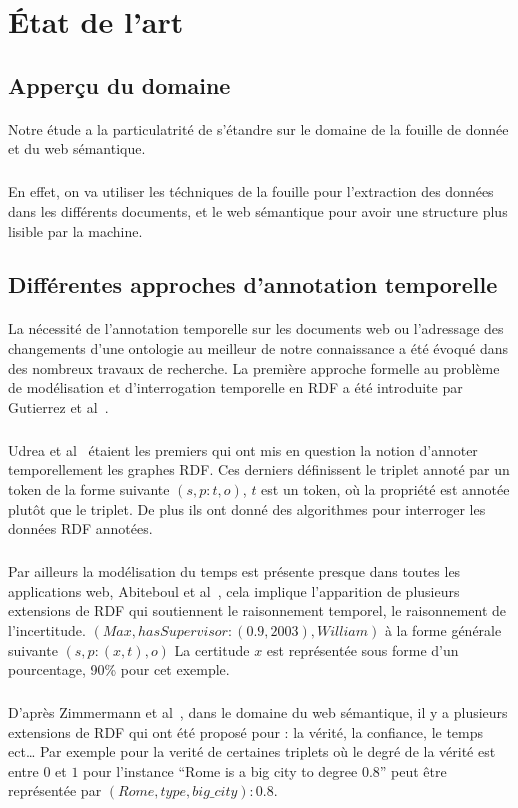 \section*{État de l'art}
\subsection*{Apperçu du domaine}
\paragraph{}
Notre étude a la particulatrité de s'étandre sur le domaine de la fouille de donnée et du web sémantique.
\subparagraph{}
En effet, on va utiliser les téchniques de la fouille pour l'extraction des données dans les différents documents, et le web sémantique pour avoir une structure plus lisible par la machine.
\subsection*{Différentes approches d'annotation temporelle}			
\paragraph{}
La nécessité de l’annotation temporelle sur les documents web ou l’adressage des changements d’une ontologie au meilleur de notre connaissance a été évoqué dans des nombreux travaux de recherche. La première approche formelle au problème de modélisation et d’interrogation temporelle en RDF a été introduite par Gutierrez et al~\cite{gutierrez2005}.
\subparagraph{}
Udrea et al~\cite{udrea2006} étaient les premiers qui ont mis en question la notion d'annoter temporellement les graphes RDF. 
Ces derniers définissent le triplet annoté par un token de la forme suivante $(s,p:t,o)$, $t$ est un token, où la propriété est annotée plutôt que le triplet.
De plus ils ont donné des algorithmes pour interroger les données RDF annotées.
\subparagraph{}
Par ailleurs la modélisation du temps est présente presque dans toutes les applications web, Abiteboul et al~\cite{abiteboul1997}, cela implique l'apparition de plusieurs extensions de  RDF qui soutiennent le raisonnement temporel, le raisonnement de l’incertitude.   
\newline
$(Max,hasSupervisor : (0.9,2003),William)$ à la forme générale suivante $(s, p : (x,t),o)$
\newline 
La certitude $x$ est représentée sous forme d'un pourcentage, 90\% pour cet exemple.
\subparagraph{}
D'après Zimmermann et al~\cite{zimmermann2012}, dans le domaine du web sémantique, il y a plusieurs extensions de RDF qui ont été proposé pour : la vérité, la confiance, le temps ect…
\newline
Par exemple pour la verité de certaines triplets où le degré de la vérité est entre $0$ et $1$
pour l’instance “Rome is a big city to degree 0.8” peut être représentée par $(Rome, type,big{\_}city) : 0.8$.
